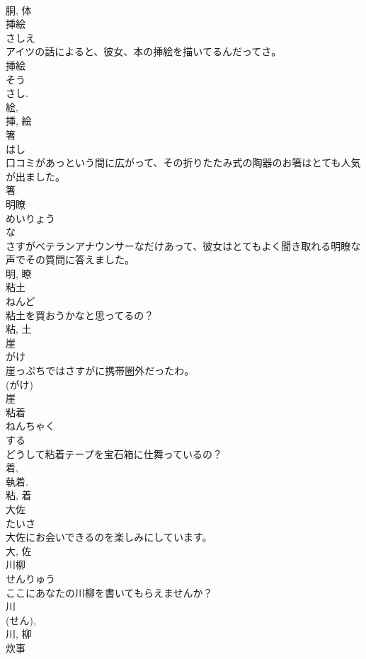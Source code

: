 \documentclass[8pt]{extreport}
\begin{document}
\begin{CJK}{UTF8}{min}
\\	胴, 体	
\\	挿絵	
\\	さしえ	
\\	アイツの話によると、彼女、本の挿絵を描いてるんだってさ。	
\\	挿絵 
\\	そう 
\\	さし. 
\\	絵, 
\\	挿, 絵	
\\	箸	
\\	はし	
\\	口コミがあっという間に広がって、その折りたたみ式の陶器のお箸はとても人気が出ました。	
\\	箸	
\\	明瞭	
\\	めいりょう	
\\	な 
\\	さすがベテランアナウンサーなだけあって、彼女はとてもよく聞き取れる明瞭な声でその質問に答えました。	
\\	明, 瞭	
\\	粘土	
\\	ねんど	
\\	粘土を買おうかなと思ってるの？	
\\	粘, 土	
\\	崖	
\\	がけ	
\\	崖っぷちではさすがに携帯圏外だったわ。	
\\	(がけ) 
\\	崖	
\\	粘着	
\\	ねんちゃく	
\\	する 
\\	どうして粘着テープを宝石箱に仕舞っているの？	
\\	着, 
\\	執着. 
\\	粘, 着	
\\	大佐	
\\	たいさ	
\\	大佐にお会いできるのを楽しみにしています。	
\\	大, 佐	
\\	川柳	
\\	せんりゅう	
\\	ここにあなたの川柳を書いてもらえませんか？	
\\	川 
\\	(せん), 
\\	川, 柳	
\\	炊事	

\end{CJK}
\end{document}
